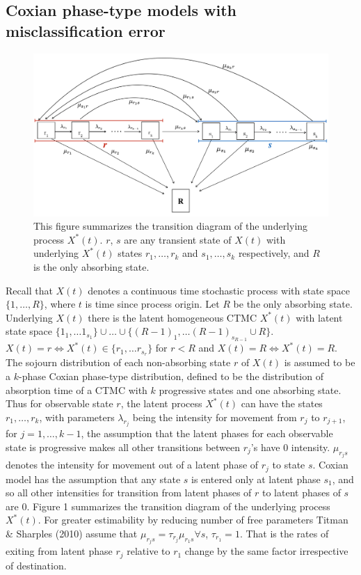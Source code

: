 \documentclass{uwstat572}
\begin{document}
\subsection{Coxian phase-type models with misclassification error} \label{subsection : coxian}
\begin{figure}[t]
\centering
\includegraphics[scale=0.5]{coxmodelstitched2.png}
\caption{This figure summarizes the transition diagram of the underlying process $X^*(t)$. $r$, $s$ are any transient state of $X(t)$ with underlying $X^*(t)$ states $r_1,\ldots,r_k$ and $s_1,\ldots,s_k$ respectively, and $R$ is the only absorbing state.}
\end{figure}

Recall that $X(t)$ denotes a continuous time stochastic process with state space $\{1,\ldots, R\}$, where $t$ is time since process origin. Let $R$ be the only absorbing state. Underlying $X(t)$ there is the latent homogeneous CTMC $X^*(t)$ with latent state space $\{1_1,\ldots1_{s_1}\}\cup \ldots \cup \{(R-1)_1,\ldots (R-1)_{s_{R-1}} \cup R\} $. $X(t)=r \Leftrightarrow X^*(t) \in \{r_1,\ldots r_{s_r}\}$ for $r<R$ and $X(t)=R \Leftrightarrow X^*(t) =R$. The sojourn distribution of each non-absorbing state $r$ of $X(t)$ is assumed to be a $k$-phase Coxian phase-type distribution, defined to be the distribution of absorption time of a CTMC with $k$ progressive states and one absorbing state. Thus for observable state $r$, the latent process $X^* (t)$ can have the states $r_1,\ldots,r_k$,  with parameters $\lambda_{r_j}$ being the intensity for movement from $r_j$ to $r_{j+1}$, for $j=1,\ldots, k-1$, the assumption that the latent phases for each observable state is progressive makes all other transitions between $r_j$'s have $0$ intensity. $\mu_{r_j s}$ denotes the intensity for movement out of a latent phase of $r_j$ to state $s$. Coxian model has the assumption that any state $s$ is entered only at latent phase $s_1$, and so all other intensities for transition from latent phases of $r$ to latent phases of $s$ are $0$. Figure 1 summarizes the transition diagram of the underlying process $X^*(t)$. For greater estimability by reducing number of free parameters Titman \& Sharples (2010) assume that $\mu_{r_j s} = \tau_{r_j} \mu_{r_1 s} \forall s$, $\tau_{r_1}=1$. That is the rates of exiting from latent phase $r_j$ relative to $r_1$ change by the same factor irrespective of destination. 
\end{document}
